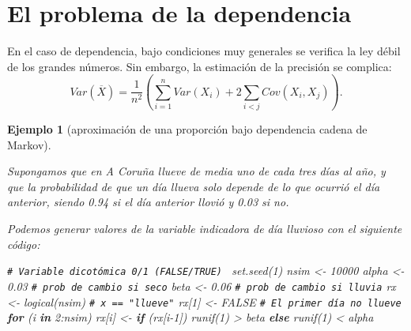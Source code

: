 \documentclass[
  10pt,
]{book}
\newenvironment{Shaded}{\begin{snugshade}}{\end{snugshade}}
\newcommand{\CommentTok}[1]{\textcolor[rgb]{0.56,0.35,0.01}{\textit{#1}}}
\newcommand{\ConstantTok}[1]{\textcolor[rgb]{0.00,0.00,0.00}{#1}}
\newcommand{\ControlFlowTok}[1]{\textcolor[rgb]{0.13,0.29,0.53}{\textbf{#1}}}
\newcommand{\DecValTok}[1]{\textcolor[rgb]{0.00,0.00,0.81}{#1}}
\newcommand{\FloatTok}[1]{\textcolor[rgb]{0.00,0.00,0.81}{#1}}
\newcommand{\FunctionTok}[1]{\textcolor[rgb]{0.00,0.00,0.00}{#1}}
\newcommand{\NormalTok}[1]{#1}
\newcommand{\OtherTok}[1]{\textcolor[rgb]{0.56,0.35,0.01}{#1}}
\newcommand{\SpecialCharTok}[1]{\textcolor[rgb]{0.00,0.00,0.00}{#1}}
\theoremstyle{break}
\newtheorem{example}{Ejemplo}[chapter]
\theoremstyle{nonumberplain}
\renewcommand{\CommentTok}[1]{\textcolor[rgb]{0.41,0.41,0.41}{\texttt{#1}}}
\begin{document}
\hypertarget{el-problema-de-la-dependencia}{%
\section{El problema de la dependencia}\label{el-problema-de-la-dependencia}}

En el caso de dependencia, bajo condiciones muy generales se verifica la ley débil de los grandes números.
Sin embargo, la estimación de la precisión se complica:
\[Var\left( \overline{X}\right) =\frac{1}{n^{2}}\left( 
\sum_{i=1}^{n}Var\left( X_{i} \right) + 2\sum_{i<j}Cov\left( X_{i},X_{j}\right) \right).\]

\begin{example}[aproximación de una proporción bajo dependencia cadena de Markov]
\protect\hypertarget{exm:mmc}{}\label{exm:mmc}

Supongamos que en A Coruña llueve de media uno de cada tres días al año,
y que la probabilidad de que un día llueva solo depende de lo que ocurrió el día anterior,
siendo 0.94 si el día anterior llovió y 0.03 si no.

Podemos generar valores de la variable indicadora de día lluvioso con el siguiente código:

\begin{Shaded}
\begin{Highlighting}[]
\CommentTok{\# Variable dicotómica 0/1 (FALSE/TRUE)  }
\FunctionTok{set.seed}\NormalTok{(}\DecValTok{1}\NormalTok{)}
\NormalTok{nsim }\OtherTok{\textless{}{-}} \DecValTok{10000}
\NormalTok{alpha }\OtherTok{\textless{}{-}} \FloatTok{0.03} \CommentTok{\# prob de cambio si seco}
\NormalTok{beta }\OtherTok{\textless{}{-}} \FloatTok{0.06}  \CommentTok{\# prob de cambio si lluvia}
\NormalTok{rx }\OtherTok{\textless{}{-}} \FunctionTok{logical}\NormalTok{(nsim) }\CommentTok{\# x == "llueve"}
\NormalTok{rx[}\DecValTok{1}\NormalTok{] }\OtherTok{\textless{}{-}} \ConstantTok{FALSE} \CommentTok{\# El primer día no llueve}
\ControlFlowTok{for}\NormalTok{ (i }\ControlFlowTok{in} \DecValTok{2}\SpecialCharTok{:}\NormalTok{nsim)}
\NormalTok{  rx[i] }\OtherTok{\textless{}{-}} \ControlFlowTok{if}\NormalTok{ (rx[i}\DecValTok{{-}1}\NormalTok{]) }\FunctionTok{runif}\NormalTok{(}\DecValTok{1}\NormalTok{) }\SpecialCharTok{\textgreater{}}\NormalTok{ beta }\ControlFlowTok{else} \FunctionTok{runif}\NormalTok{(}\DecValTok{1}\NormalTok{) }\SpecialCharTok{\textless{}}\NormalTok{ alpha}
\end{Highlighting}
\end{Shaded}


\end{example}
\end{document}
